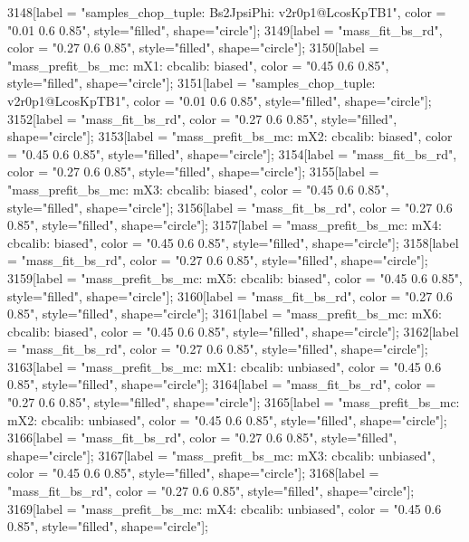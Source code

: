 {	3148[label = "samples_chop_tuple\nmode: Bs2JpsiPhi\nversion: v2r0p1@LcosKpTB1", color = "0.01 0.6 0.85", style="filled", shape="circle"];
	3149[label = "mass_fit_bs_rd", color = "0.27 0.6 0.85", style="filled", shape="circle"];
	3150[label = "mass_prefit_bs_mc\nmassbin: mX1\nmassmodel: cbcalib\ntrigger: biased", color = "0.45 0.6 0.85", style="filled", shape="circle"];
	3151[label = "samples_chop_tuple\nversion: v2r0p1@LcosKpTB1", color = "0.01 0.6 0.85", style="filled", shape="circle"];
	3152[label = "mass_fit_bs_rd", color = "0.27 0.6 0.85", style="filled", shape="circle"];
	3153[label = "mass_prefit_bs_mc\nmassbin: mX2\nmassmodel: cbcalib\ntrigger: biased", color = "0.45 0.6 0.85", style="filled", shape="circle"];
	3154[label = "mass_fit_bs_rd", color = "0.27 0.6 0.85", style="filled", shape="circle"];
	3155[label = "mass_prefit_bs_mc\nmassbin: mX3\nmassmodel: cbcalib\ntrigger: biased", color = "0.45 0.6 0.85", style="filled", shape="circle"];
	3156[label = "mass_fit_bs_rd", color = "0.27 0.6 0.85", style="filled", shape="circle"];
	3157[label = "mass_prefit_bs_mc\nmassbin: mX4\nmassmodel: cbcalib\ntrigger: biased", color = "0.45 0.6 0.85", style="filled", shape="circle"];
	3158[label = "mass_fit_bs_rd", color = "0.27 0.6 0.85", style="filled", shape="circle"];
	3159[label = "mass_prefit_bs_mc\nmassbin: mX5\nmassmodel: cbcalib\ntrigger: biased", color = "0.45 0.6 0.85", style="filled", shape="circle"];
	3160[label = "mass_fit_bs_rd", color = "0.27 0.6 0.85", style="filled", shape="circle"];
	3161[label = "mass_prefit_bs_mc\nmassbin: mX6\nmassmodel: cbcalib\ntrigger: biased", color = "0.45 0.6 0.85", style="filled", shape="circle"];
	3162[label = "mass_fit_bs_rd", color = "0.27 0.6 0.85", style="filled", shape="circle"];
	3163[label = "mass_prefit_bs_mc\nmassbin: mX1\nmassmodel: cbcalib\ntrigger: unbiased", color = "0.45 0.6 0.85", style="filled", shape="circle"];
	3164[label = "mass_fit_bs_rd", color = "0.27 0.6 0.85", style="filled", shape="circle"];
	3165[label = "mass_prefit_bs_mc\nmassbin: mX2\nmassmodel: cbcalib\ntrigger: unbiased", color = "0.45 0.6 0.85", style="filled", shape="circle"];
	3166[label = "mass_fit_bs_rd", color = "0.27 0.6 0.85", style="filled", shape="circle"];
	3167[label = "mass_prefit_bs_mc\nmassbin: mX3\nmassmodel: cbcalib\ntrigger: unbiased", color = "0.45 0.6 0.85", style="filled", shape="circle"];
	3168[label = "mass_fit_bs_rd", color = "0.27 0.6 0.85", style="filled", shape="circle"];
	3169[label = "mass_prefit_bs_mc\nmassbin: mX4\nmassmodel: cbcalib\ntrigger: unbiased", color = "0.45 0.6 0.85", style="filled", shape="circle"];
}
